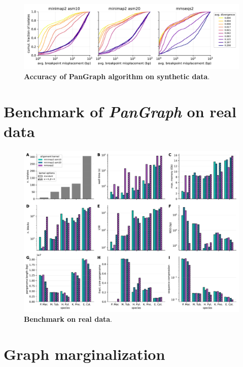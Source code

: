 \documentclass[aps,rmp,reprint,superscriptaddress,notitlepage,10pt,onecolumn]{revtex4-1}
\begin{document}
\begin{figure}[h]
    \includegraphics[width=\textwidth]{figs_suppl/accuracy_comparison.pdf}
    \caption{{\bf Accuracy of PanGraph algorithm on synthetic data}.}
    \label{fig:benchmark-accuracy-suppl}
\end{figure}

\section{Benchmark of \textit{PanGraph} on real data}

\begin{figure}[h]
    \includegraphics[width=\textwidth]{figs_suppl/panx_benchmark_suppl.pdf}
    \caption{{\bf Benchmark on real data}.}
    \label{fig:panx-benchmark-suppl}
\end{figure}


\section{Graph marginalization}
\end{document}
